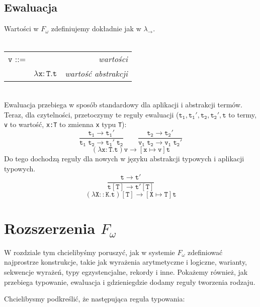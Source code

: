 \documentclass[11pt,leqno]{article}
\begin{document}
\subsection{Ewaluacja}

Wartości w $F_\omega$ zdefiniujemy dokładnie jak w $\lambda_{\rightarrow}$. \\ \\
\begin{tabular}{| l c r |}
  \hline
  $\mathtt{v}$ ::= &  & \textit{wartości}  \\
   & $\mathtt{\lambda x:T.t}$ & \textit{wartość abstrakcji} \\
  \hline
\end{tabular} \\

Ewaluacja przebiega w sposób standardowy dla aplikacji i abstrakcji termów. Teraz, dla czytelności, przetoczymy te reguły ewaluacji ($\mathtt{t_1,t_1',t_2,t_2',t}$ to termy, \texttt{v} to wartość, \texttt{x:T} to zmienna \texttt{x} typu \texttt{T}):
	\[\mathtt{
		\frac{t_1 \longrightarrow t_1'}{t_1\;t_2 \longrightarrow t_1'\;t_2}
                \qquad
                \frac{t_2 \longrightarrow t_2'}{v_1\;t_2 \longrightarrow v_1\;t_2'}}
	\]
 	\[\mathtt{
		(\lambda x:T.t)v \longrightarrow [x \mapsto v]t}
	\]
Do tego dochodzą reguły dla nowych w języku abstrakcji typowych i aplikacji typowych.
	\[\mathtt{
		\frac{t \longrightarrow t'}{t[T] \longrightarrow t'[T]}}
	\]
 	\[\mathtt{
		(\lambda X::K.t)[T] \longrightarrow [X \mapsto T]t}
	\]

\section{Rozszerzenia $F_\omega$}
\setcounter{equation}{0}

W rozdziale tym chcielibyśmy poruszyć, jak w systemie $F_\omega$ zdefiniować najprostrze
konstrukcje, takie jak wyrażenia arytmetyczne i logiczne, warianty, sekwencje wyrażeń, 
typy egzystencjalne, rekordy i inne. Pokażemy również, jak przebiega typowanie, ewaluacja i 
gdzieniegdzie dodamy reguły tworzenia rodzaju.

Chcielibysmy podkreślić, że następująca reguła typowania:
\end{document}

